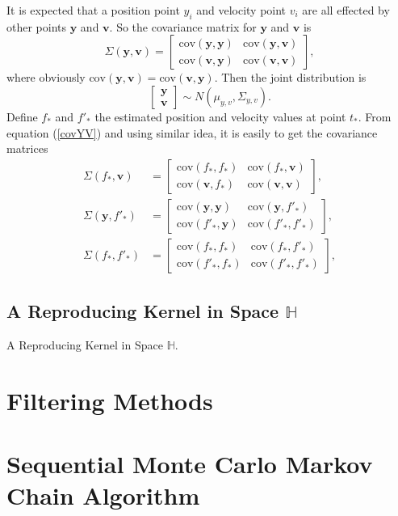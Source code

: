 It is expected that a position point $y_i$ and velocity point $v_i$ are all effected by other points $\mathbf{y}$ and $\mathbf{v}$. So the covariance matrix for $\mathbf{y}$ and $\mathbf{v}$ is
\begin{equation}\label{covYV}
\Sigma(\mathbf{y},\mathbf{v}) = 
\left[
\begin{matrix}
\text{cov}(\mathbf{y},\mathbf{y}) & \text{cov}(\mathbf{y},\mathbf{v}) \\
\text{cov}(\mathbf{v},\mathbf{y}) & \text{cov}(\mathbf{v},\mathbf{v}) 
\end{matrix}\right],
\end{equation}
where obviously $\text{cov}(\mathbf{y},\mathbf{v}) =\text{cov}(\mathbf{v},\mathbf{y})$. Then the joint distribution  is 
\begin{equation}
\left[
\begin{matrix}
\mathbf{y}\\
\mathbf{v}
\end{matrix}
\right] \sim N(\mu_{y,v},\Sigma_{y,v}).
\end{equation}
Define $f_*$ and $f'_*$ the estimated position and velocity values at point $t_*$. From equation (\ref{covYV}) and using similar idea, it is easily to get the covariance matrices 
\begin{equation}
\begin{split}
\Sigma(f_*,\mathbf{v}) &= 
\left[
\begin{matrix}
\text{cov}(f_*,f_*) & \text{cov}(f_*,\mathbf{v}) \\
\text{cov}(\mathbf{v},f_*) & \text{cov}(\mathbf{v},\mathbf{v}) 
\end{matrix}\right],\\
\Sigma(\mathbf{y},f'_*) &= 
\left[
\begin{matrix}
\text{cov}(\mathbf{y},\mathbf{y}) & \text{cov}(\mathbf{y},f'_*) \\
\text{cov}(f'_*,\mathbf{y}) & \text{cov}(f'_*,f'_*) 
\end{matrix}\right],\\
\Sigma(f_*,f'_*) &= 
\left[
\begin{matrix}
\text{cov}(f_*,f_*) & \text{cov}(f_*,f'_*) \\
\text{cov}(f'_*,f_*) & \text{cov}(f'_*,f'_*) 
\end{matrix}\right],
\end{split}
\end{equation}

\subsection{A Reproducing Kernel in Space $\mathbb{H}$}\label{sectionRK}

A Reproducing Kernel in Space $\mathbb{H}$.


\section{Filtering Methods}

\section{Sequential Monte Carlo Markov Chain Algorithm}



